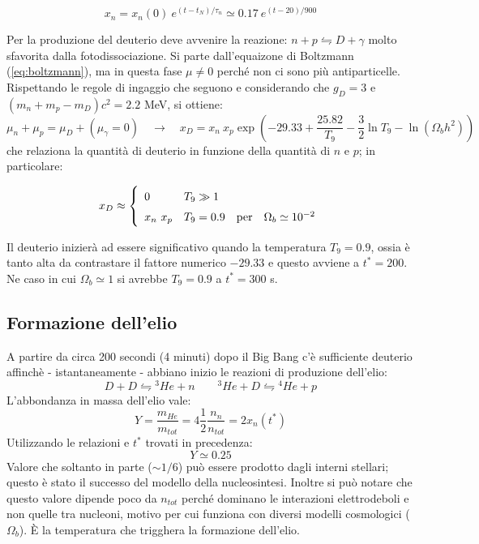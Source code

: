 \begin{equation*}
    x_n = x_n (0)~ e^{(t-t_N) / \tau_n}\simeq 0.17 ~e^{(t-20)/ 900}
\end{equation*}

\vspace{1em}
\noindent Per la produzione del deuterio deve avvenire la reazione: $n+p \leftrightharpoons D + \gamma$ molto sfavorita dalla fotodissociazione. Si parte dall'equaizone di Boltzmann (\ref{eq:boltzmann}), ma in questa fase $\mu\neq 0$ perché non ci sono più antiparticelle. Rispettando le regole di ingaggio che seguono e considerando che $g_D=3$ e $(m_n+m_p-m_D)c^2=2.2$ MeV, si ottiene:
\begin{equation*}
    \mu_n + \mu_p = \mu_D +  (\mu_\gamma =0) \quad \rightarrow \quad x_D=x_n ~x_p \exp{\left(-29.33+\frac{25.82}{T_9} -\frac{3}{2}\ln T_9 - \ln (\Omega_b h^2) \right)} 
\end{equation*}
che relaziona la quantità di deuterio in funzione della quantità di $n$ e $p$; in particolare:

\begin{equation}x_D \approx \left\{
    \def\arraystretch{1.5}
        \begin{array}{ll}
            0 & T_9 \gg 1 \\ 
            x_n ~x_p & T_9 = 0.9 \quad\mathrm{per}\quad \Omega_b \simeq 10^{-2}
    \end{array}\right. \label{eq:xdeuterio}
\end{equation}

Il deuterio inizierà ad essere significativo quando la temperatura $T_9=0.9$, ossia è tanto alta da contrastare il fattore numerico $-29.33$ e questo avviene a $t^*=200$. Ne caso in cui $\Omega_b \simeq 1$ si avrebbe $T_9=0.9$ a $t^*=300$ s.

\subsection{Formazione dell'elio}
A partire da circa 200 secondi (4 minuti) dopo il Big Bang c'è sufficiente deuterio affinchè - istantaneamente - abbiano inizio le reazioni di produzione dell'elio:
$$
D + D \leftrightharpoons {^3He} + n \qquad {^3He} + D \leftrightharpoons {^4He} + p 
$$
L'abbondanza in massa dell'elio vale:
\begin{equation}
    Y = \frac{m_{He}}{m_{tot}} = 4 \frac{1}{2} \frac{n_n}{n_{tot}} = 2 x_n(t^*)
\end{equation}
Utilizzando le relazioni e $t^*$ trovati in precedenza:
$$
Y\simeq 0.25
$$
Valore che soltanto in parte ($\sim 1/6$) può essere prodotto dagli interni stellari; questo è stato il successo del modello della nucleosintesi. Inoltre si può notare che questo valore dipende poco da $n_{tot}$ perché dominano le interazioni elettrodeboli e non quelle tra nucleoni, motivo per cui funziona con diversi modelli cosmologici ($\Omega_b$). È la temperatura che trigghera la formazione dell'elio. 

